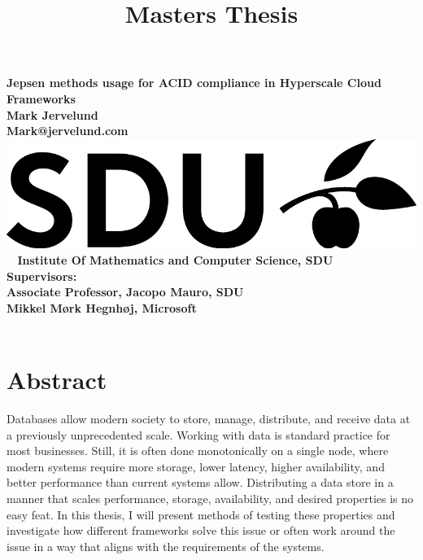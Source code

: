\documentclass[a4paper,10pt,titlepage]{report}
\date{}
\title{Masters Thesis}
\begin{document}
    \begin{titlepage}
        \centering
        \vspace*{9\baselineskip}
        \huge
        \bfseries
        Jepsen methods usage for ACID compliance in Hyperscale Cloud Frameworks \\
        \normalfont
        Mark Jervelund \\
        Mark@jervelund.com \\
        \vspace*{8\baselineskip}
        \normalfont
        \includegraphics[scale=1]{logos/SDU_BLACK.png}
        \vfill\
        \vspace{5mm}
        Institute Of Mathematics and Computer Science, SDU \\
        Supervisors:\\
        Associate Professor, Jacopo Mauro, SDU \\
        Mikkel Mørk Hegnhøj, Microsoft \\

        \textbf{\datedate} \\[2\baselineskip]
    \end{titlepage}

    \renewcommand{\thepage}{\roman{page}}%
    \tableofcontents
    \newpage
    \setcounter{page}{1}
    \renewcommand{\thepage}{\arabic{page}}


    \section*{Abstract}
    Databases allow modern society to store, manage, distribute, and receive data at a previously unprecedented scale. Working with data is standard practice for most businesses. Still, it is often done monotonically on a single node, where modern systems require more storage, lower latency, higher availability, and better performance than current systems allow. Distributing a data store in a manner that scales performance, storage, availability, and desired properties is no easy feat. In this thesis, I will present methods of testing these properties and investigate how different frameworks solve this issue or often work around the issue in a way that aligns with the requirements of the systems. \\
    \vspace{5mm}
\end{document}
